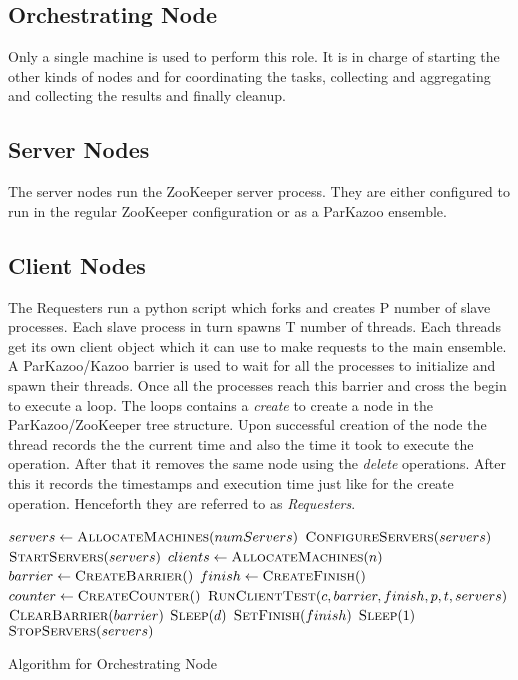 \subsection{Orchestrating Node}
Only a single machine is used to perform this role. It is in charge of starting the other kinds of nodes and for coordinating the tasks, collecting and aggregating and collecting the results and finally cleanup.
\subsection{Server Nodes}
The server nodes run the ZooKeeper server process. They are either configured to run in the regular ZooKeeper configuration or as a ParKazoo ensemble.
\subsection{Client Nodes}
The Requesters run a python script which forks and creates P number of slave processes. Each slave process in turn spawns T number of threads. Each threads get its own client object which it can use to make requests to the main ensemble. A ParKazoo/Kazoo barrier is used to wait for all the processes to initialize and spawn their threads. Once all the processes reach this barrier and cross the begin to execute a loop. The loops contains a \textit{create} to create a node in the ParKazoo/ZooKeeper tree structure. Upon successful creation of the node the thread records the the current time and also the time it took to execute the operation. After that it removes the same node using the \textit{delete} operations. After this it records the timestamps and execution time just like for the create operation. Henceforth they are referred to as \textit{Requesters}. 

\begin{algorithm}
	\begin{algorithmic}
		\State $servers\gets \Call{AllocateMachines}{numServers}$
		\State $\Call {ConfigureServers}{servers}$
		\State $\Call {StartServers}{servers}$
		\State $clients\gets \Call{AllocateMachines}{n}$
		\State $barrier\gets \Call{CreateBarrier}{\null}$
		\State $finish\gets \Call{CreateFinish}{\null}$
		\State $counter\gets \Call{CreateCounter}{\null}$
		\State $\Call{RunClientTest}{c,barrier,finish,p,t,servers}$
		\EndFor
		\State {}
		\EndWhile
		\State $\Call{ClearBarrier}{barrier}$
		\State $\Call{Sleep}{d}$
		\State $\Call{SetFinish}{finish}$
		\State $\Call{Sleep}{1}$
		\EndWhile
		\State $\Call{StopServers}{servers}$
		\EndProcedure
		
	\end{algorithmic}
	\caption{Algorithm for Orchestrating Node}
\end{algorithm}

